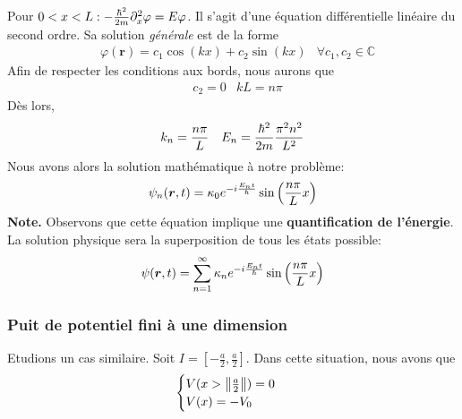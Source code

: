 \documentclass[../notesdecours]{subfiles}
\begin{document}
Pour $0 < x < L : - \frac{\hbar^2}{2m} \partial_x^2 \varphi = E \varphi$. Il s'agit d'une équation différentielle linéaire du second ordre. Sa solution \textit{générale} est de la forme
\begin{align}
&\varphi(\bm{r}) = c_1 \cos \left(kx\right) + c_2\sin \left( kx \right)									&\forall c_1,c_2 \in \mathbb{C}
\label{Kikoo}
\end{align}
Afin de respecter les conditions aux bords, nous aurons que
\begin{align}
&c_2 = 0 &kL = n\pi
\end{align}
Dès lors,
\begin{align}
&k_n = \frac{n\pi}{L} &E_n = \frac{\hbar^2}{2m} \frac{\pi^2n^2}{L^2}
\end{align}
Nous avons alors la solution mathématique à notre problème:
\begin{equation}
\psi_n (\bm{r},t) = \kappa_0 e^{-i \frac{E_nt}{\hbar}}\sin \left( \frac{n\pi}{L}x \right)
\end{equation}
\textbf{Note.} Observons que cette équation implique une \textbf{quantification de l'énergie}. La solution physique sera la superposition de tous les états possible:
\begin{equation}
\psi (\bm{r},t) = \sum_{n = 1}^\infty \kappa_n e^{-i \frac{E_nt}{\hbar}}\sin \left( \frac{n\pi}{L}x \right)
\end{equation}

\subsubsection{Puit de potentiel fini à une dimension}
Etudions un cas similaire. Soit $I = \left[-\frac{a}{2},\frac{a}{2}\right]$. Dans cette situation, nous avons que 
\begin{equation}
\begin{cases} 
V(x > \norm{\frac{a}{2}}) = 0 \\ 
V(x) = -V_0\\
\end{cases}
\end{equation}
\end{document}
